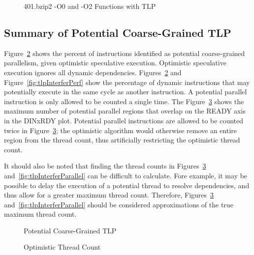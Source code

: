 \documentclass[defaultstyle,11pt]{thesis}
\begin{document}
\begin{figure}
  \begin{centering}
    
  \end{centering}
  \caption{401.bzip2 -O0 and -O2 Functions with TLP}
  \label{fig:401bzip2sinFuncs}
\end{figure}

\subsection{Summary of Potential Coarse-Grained TLP}

Figure~\ref{fig:tlpNaivePerf} shows the percent of instructions
identified as potential coarse-grained parallelism, given optimistic
speculative execution. Optimistic speculative execution ignores all
dynamic dependencies. Figures~\ref{fig:tlpNaivePerf} and
Figure~\ref{fig:tlpInterferPerf} show the percentage of dynamic
instructions that may potentially execute in the same cycle as another
instruction.  A potential parallel instruction is only allowed to be
counted a single time. The Figure~\ref{fig:tlpNaiveParallel} shows the
maximum number of potential parallel regions that overlap on the READY
axis in the DINxRDY plot. Potential parallel instructions are allowed
to be counted twice in Figure~\ref{fig:tlpNaiveParallel}; the optimistic
algorithm would otherwise remove an entire region from the thread
count, thus artificially restricting the optimistic thread count.

It should also be noted that finding the thread counts in
Figures~\ref{fig:tlpNaiveParallel} and~\ref{fig:tlpInterferParallel} can
be difficult to calculate.  Fore example, it may be possible to delay
the execution of a potential thread to resolve dependencies, and thus
allow for a greater maximum thread count.  Therefore,
Figures~\ref{fig:tlpNaiveParallel} and~\ref{fig:tlpInterferParallel}
should be considered approximations of the true maximum thread
count.

\begin{figure}
  \centering
  \caption{Potential Coarse-Grained TLP}
  \label{fig:tlpNaivePerf}
\end{figure}


\begin{figure}
  \centering
  \caption{Optimistic Thread Count}
  \label{fig:tlpNaiveParallel}
\end{figure}
\end{document}
